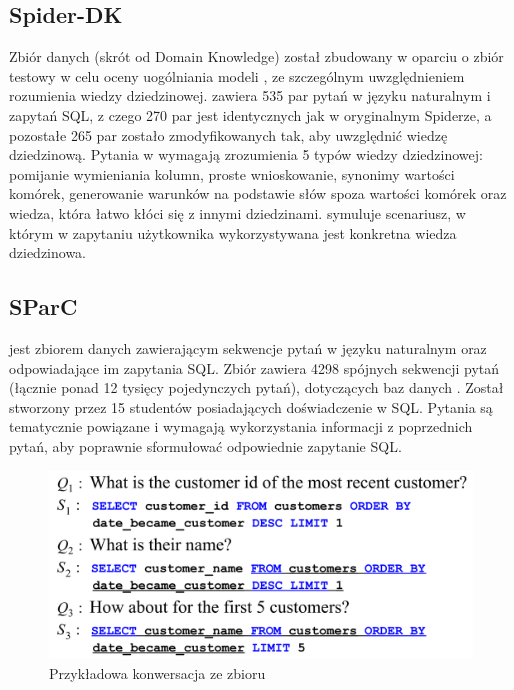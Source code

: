 \subsection{Spider-DK}
Zbiór danych  (skrót od Domain Knowledge) został zbudowany w oparciu o zbiór testowy  w celu oceny uogólniania modeli , ze szczególnym uwzględnieniem rozumienia wiedzy dziedzinowej.  zawiera 535 par pytań w języku naturalnym i zapytań SQL, z czego 270 par jest identycznych jak w oryginalnym Spiderze, a pozostałe 265 par zostało zmodyfikowanych tak, aby uwzględnić wiedzę dziedzinową. Pytania w  wymagają zrozumienia 5 typów wiedzy dziedzinowej: pomijanie wymieniania kolumn, proste wnioskowanie, synonimy wartości komórek, generowanie warunków na podstawie słów spoza wartości komórek oraz wiedza, która łatwo kłóci się z innymi dziedzinami.  symuluje scenariusz, w którym w zapytaniu użytkownika wykorzystywana jest konkretna wiedza dziedzinowa.

\begin{minipage}{\linewidth}

\end{minipage}

\subsection{SParC}
 jest zbiorem danych zawierającym sekwencje pytań w języku naturalnym oraz odpowiadające im zapytania SQL. Zbiór zawiera 4298 spójnych sekwencji pytań (łącznie ponad 12 tysięcy pojedynczych pytań), dotyczących baz danych . Został stworzony przez 15 studentów posiadających doświadczenie w SQL. Pytania są tematycznie powiązane i wymagają wykorzystania informacji z poprzednich pytań, aby poprawnie sformułować odpowiednie zapytanie SQL.

\begin{figure}[ht!]
  \centering
  \includegraphics[width=0.6\linewidth]{images/sparc_example.png}
  \caption{Przykładowa konwersacja ze zbioru }
  \label{fig:sparc-example}
\end{figure}


